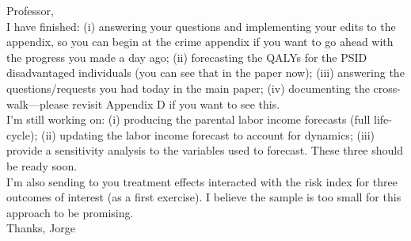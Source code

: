 






\noindent Professor, \\

\noindent I have finished: (i) answering your questions and implementing your edits to the appendix, so you can begin at the crime appendix if you want to go ahead with the progress you made a day ago; (ii) forecasting the QALYs for the PSID disadvantaged individuals (you can see that in the paper now); (iii) answering the questions/requests you had today in the main paper; (iv) documenting the cross-walk---please revisit Appendix D if you want to see this.\\

\noindent I'm still working on: (i) producing the parental labor income forecasts (full life-cycle); (ii) updating the labor income forecast to account for dynamics; (iii) provide a sensitivity analysis to the variables used to forecast. These three should be ready soon.\\

\noindent I'm also sending to you treatment effects interacted with the risk index for three outcomes of interest (as a first exercise). I believe the sample is too small for this approach to be promising.\\

\noindent Thanks, 
\noindent Jorge

 